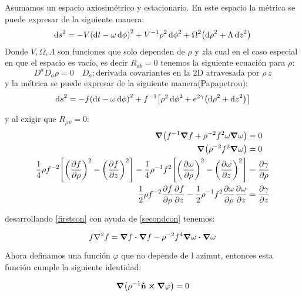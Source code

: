 \documentclass[../Main.tex]{subfiles}
\begin{document}
Asumamos un espacio axiosimétrico y estacionario. En este espacio la métrica se puede expresar de la siguiente manera:
%
\begin{equation}
\dd{s}^{2} = -V\qty(\dd{t}-\omega\dd{\phi})^{2}+V^{-1}\rho^{2}\dd{\phi}^{2}+\Omega^{2}\qty(\dd{\rho}^{2}+\Lambda\dd{z}^{2})
\end{equation}
%
Donde $V,\Omega, \Lambda$ son funciones que solo dependen de $\rho$ y $z$la cual en el caso especial en que el espacio es vacío, es decir $R_{ab}=0$ tenemos la siguiente ecuación para $\rho$:
%
\begin{equation}
    D^{a}D_{a}\rho=0 \quad D_{a}: \text{derivada covariantes en la 2D atravesada por } \rho \, z
\end{equation}
%
y la métrica se puede expresar de la siguiente manera(Papapetrou):
%
\begin{equation}
    \dd{s}^{2} = -f\qty(\dd{t}-\omega\dd{\phi})^{2}+f^{-1}\qty[\rho^{2}\dd{\phi}^{2}+e^{2\gamma}\qty(\dd{\rho}^{2}+\dd{z}^{2})]
    \label{papapetrou}
\end{equation}

y al exigir que $R_{\mu\nu}=0$:
\begin{eqnarray}
    \label{firstcon}
    \grad{\qty(f^{-1}\grad{f}+\rho^{-2}f^{2}\omega\grad{\omega})} & =0 \\
    \label{secondcon}
    \grad{\qty(\rho^{-2}f^{2}\grad{\omega})} & =0 \\
    \label{thirdcon}
    \dfrac{1}{4}\rho f^{-2}\qty[\qty(\pdv{f}{\rho})^{2}-\qty(\pdv{f}{z})^{2}]-\dfrac{1}{4}\rho^{-1}f^{2}\qty[\qty(\pdv{\omega}{\rho})^{2}-\qty(\pdv{\omega}{z})^{2}] & =\pdv{\gamma}{\rho} \\
    \dfrac{1}{2}\rho f^{-2}\pdv{f}{\rho}\pdv{f}{z}-\dfrac{1}{2}\rho^{-1} f^{2}\pdv{\omega}{\rho}\pdv{\omega}{z} & = \pdv{\gamma}{z}
    \label{fourthcon}
\end{eqnarray}

desarrollando \eqref{firstcon} con ayuda de \eqref{secondcon} tenemos:

\begin{equation}
    f\laplacian{f}=\grad{f}\vdot\grad{f}-\rho^{-2}f^{4}\grad{\omega}\vdot\grad{\omega}
    \label{conduno}
\end{equation}

Ahora definamos una función $\varphi$ que no depende de l azimut, entonces esta función cumple la siguiente identidad:

\begin{equation}
    \grad(\rho^{-1}\vu{n}\cp\grad{\varphi})=0
\end{equation}
\end{document}
